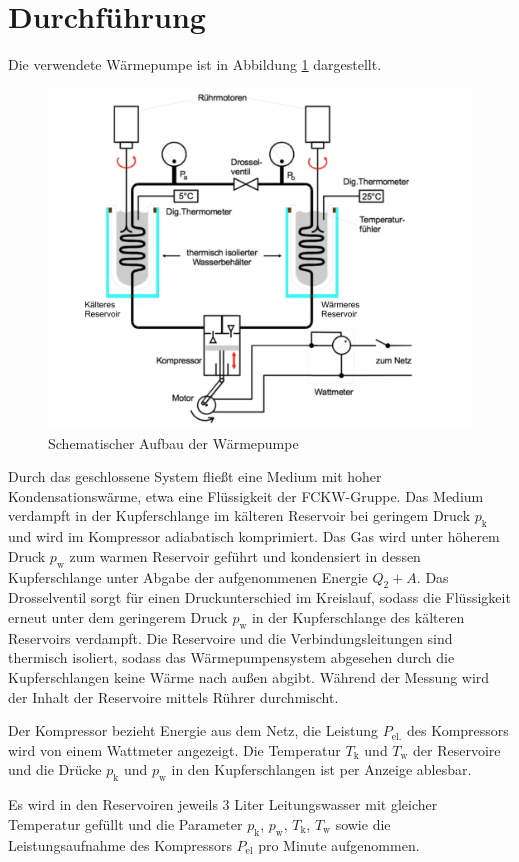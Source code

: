 \section{Durchführung}
\label{sec:Durchfuehrung}
Die verwendete Wärmepumpe ist in Abbildung \ref{fig:pumpe} dargestellt.
\begin{figure}
	\includegraphics[width=\textwidth]{Bilder/Abbildung.pdf}
	\caption{Schematischer Aufbau der Wärmepumpe \cite{V206}}
	\label{fig:pumpe}
\end{figure}
Durch das geschlossene System fließt eine Medium mit hoher Kondensationswärme, etwa eine Flüssigkeit der FCKW-Gruppe.
Das Medium verdampft in der Kupferschlange im kälteren Reservoir bei geringem Druck $p_\text{k}$ und wird im Kompressor adiabatisch komprimiert. 
Das Gas wird unter höherem Druck $p_\text{w}$ zum warmen Reservoir geführt und kondensiert in dessen Kupferschlange unter Abgabe der aufgenommenen Energie $Q_2+A$.
Das Drosselventil sorgt für einen Druckunterschied im Kreislauf, sodass die Flüssigkeit erneut unter dem geringerem Druck $p_\text{w}$ in der Kupferschlange des kälteren Reservoirs verdampft. 
Die Reservoire und die Verbindungsleitungen sind thermisch isoliert, sodass das Wärmepumpensystem abgesehen durch die Kupferschlangen keine Wärme nach außen abgibt.
Während der Messung wird der Inhalt der Reservoire mittels Rührer durchmischt.

Der Kompressor bezieht Energie aus dem Netz, die Leistung $P_\text{el.}$ des Kompressors wird von einem Wattmeter angezeigt. 
Die Temperatur $T_\text{k}$ und $T_\text{w}$ der Reservoire und die Drücke $p_\text{k}$ und $p_\text{w}$ in den Kupferschlangen ist per Anzeige ablesbar.

Es wird in den Reservoiren jeweils 3 Liter Leitungswasser mit gleicher Temperatur gefüllt und die Parameter $p_\text{k}$, $p_\text{w}$, $T_\text{k}$, $T_\text{w}$ sowie die Leistungsaufnahme des Kompressors $P_\text{el}$ pro Minute aufgenommen.